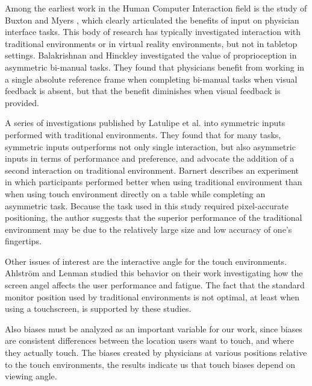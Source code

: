 \documentclass{sigchi}
\begin{document}
Among the earliest work in the Human Computer Interaction field is the study of Buxton and Myers \cite{kabbash1994two}, which clearly articulated the benefits of input on physician interface tasks. This body of research has typically investigated interaction with traditional environments or in virtual reality \cite{sousa2017vrrrroom} environments, but not in tabletop settings. Balakrishnan and Hinckley \cite{balakrishnan1999role} investigated the value of proprioception in asymmetric bi-manual tasks. They found that physicians benefit from working in a single absolute reference frame when completing bi-manual tasks when visual feedback is absent, but that the benefit diminishes when visual feedback is provided.

A series of investigations published by Latulipe et al. \cite{latulipe2005bimanual, latulipe2006symspline} into symmetric inputs performed with traditional environments. They found that for many tasks, symmetric inputs outperforms not only single interaction, but also asymmetric inputs in terms of performance and preference, and advocate the addition of a second interaction on traditional environment. Barnert \cite{barnert2005comparison} describes an experiment in which participants performed better when using traditional environment than when using touch environment directly on a table while completing an asymmetric task. Because the task used in this study required pixel-accurate positioning, the author suggests that the superior performance of the traditional environment may be due to the relatively large size and low accuracy of one’s fingertips.

Other issues of interest are the interactive angle for the touch environments. Ahlstr\"{o}m and Lenman \cite{ahlstrom1990fatigue} studied this behavior on their work investigating how the screen angel affects the user performance and fatigue. The fact that the standard monitor position used by traditional environments is not optimal, at least when using a touchscreen, is supported by these studies.

Also biases must be analyzed as an important variable for our work, since biases  are consistent differences \cite{beringer1985underlying, beringer1989operator} between the location users want to touch, and where they actually touch. The biases \cite{hall1988factors} created by physicians at various positions relative to the touch environments, the results indicate us that touch biases depend on viewing angle.
\end{document}
